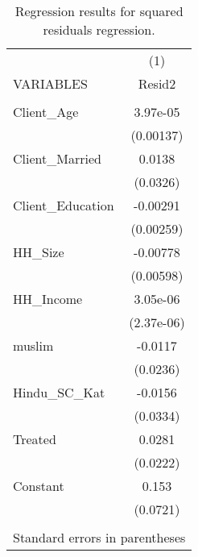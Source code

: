 \documentclass{article}
\theoremstyle{definition}
\begin{document}
\begin{table}[htbp]\centering
\begin{tabular}{lc} \hline
 & (1) \\
VARIABLES & Resid2 \\ \hline
 &  \\
Client\_Age & 3.97e-05 \\
 & (0.00137) \\
Client\_Married & 0.0138 \\
 & (0.0326) \\
Client\_Education & -0.00291 \\
 & (0.00259) \\
HH\_Size & -0.00778 \\
 & (0.00598) \\
HH\_Income & 3.05e-06 \\
 & (2.37e-06) \\
muslim & -0.0117 \\
 & (0.0236) \\
Hindu\_SC\_Kat & -0.0156 \\
 & (0.0334) \\
Treated & 0.0281 \\
 & (0.0222) \\
Constant & 0.153 \\
 & (0.0721) \\
 &  \\ \hline
\multicolumn{2}{c}{ Standard errors in parentheses} \\
\end{tabular}
\caption{Regression results for squared residuals regression.}
\end{table}
\end{document}
